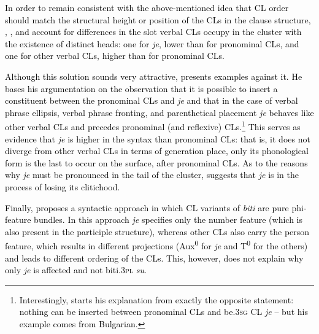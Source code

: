 \textcolor{black}{In order to remain consistent with the above-mentioned idea that CL order should match the structural height or position of the CLs in the clause structure, \citet{MiseskaTomic96}, \citet{Progovac05}, and \citet{Franks17} account for differences in the slot verbal CLs occupy in the cluster with the existence of distinct heads: one for \textit{je}, lower than for pronominal CLs, and one for other verbal CLs, higher than for pronominal CLs.}

\textcolor{black}{Although this solution sounds very attractive, \citet[126]{Boskovic01} presents examples against it. He bases his argumentation on the observation that it is possible to insert a constituent between the pronominal CLs and \textit{je} and that in the case of verbal phrase ellipsis, verbal phrase fronting, and parenthetical placement \textit{je} behaves like other verbal CLs and precedes pronominal (and reflexive) CLs.\footnote{\textcolor{black}{Interestingly, \citet[224]{Franks17} starts his explanation from exactly the opposite statement: nothing can be inserted between pronominal CLs and be.\textsc{3sg} CL \textit{je} -- but his example comes from Bulgarian.}} This serves as evidence that \textit{je} is higher in the syntax than pronominal CLs: that is, it does not diverge from other verbal CLs in terms of generation place, only its  phonological form is the last to occur on the surface, after pronominal CLs. As to the reasons why \textit{je} must be pronounced in the tail of the cluster, \citet[130f]{Boskovic01} suggests that \textit{je} is in the process of losing its clitichood.}

\textcolor{black}{Finally, \citet{Migdalski20} proposes a syntactic approach in which CL variants of \textit{biti} are pure phi-feature bundles. In this approach \textit{je} specifies only the number feature (which is also present in the participle structure), whereas other CLs also carry the person feature, which results in different projections (Aux\textsuperscript{0} for \textit{je} and T\textsuperscript{0} for the others) and leads to different ordering of the CLs. This, however, does not explain why only \textit{je} is affected and not biti.\textsc{3pl} \textit{su}.}

